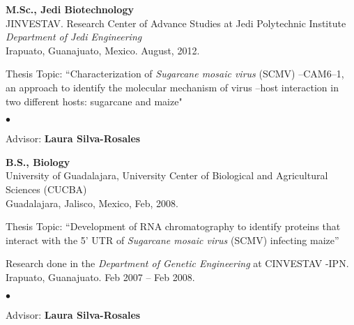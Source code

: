 \documentclass[margin,line]{res}
\newenvironment{list1}{
  \begin{list}{\ding{113}}{%
      \setlength{\itemsep}{0in}
      \setlength{\parsep}{0in} \setlength{\parskip}{0in}
      \setlength{\topsep}{0in} \setlength{\partopsep}{0in} 
      \setlength{\leftmargin}{0.17in}}}{\end{list}}
\newenvironment{list2}{
  \begin{list}{$\bullet$}{%
      \setlength{\itemsep}{0in}
      \setlength{\parsep}{0in} \setlength{\parskip}{0in}
      \setlength{\topsep}{0in} \setlength{\partopsep}{0in} 
      \setlength{\leftmargin}{0.2in}}}{\end{list}}
\begin{document}
\begin{resume}
{\bf M.Sc., Jedi Biotechnology} \\
JINVESTAV. Research Center of Advance Studies at Jedi Polytechnic Institute \\
{\em Department of Jedi Engineering} \\
Irapuato, Guanajuato, Mexico. August, 2012. 
\begin{list1}
\item[] Thesis Topic:  ``Characterization of {\it Sugarcane mosaic virus} (SCMV) --CAM6--1, an approach to identify the molecular mechanism of virus --host interaction in two different hosts: sugarcane and maize" 
\begin{list2}
\vspace*{.05in}
\item[] Advisor:  {\bf Laura Silva-Rosales}
\end{list2}
\vspace*{.05in}
\end{list1}

{\bf B.S., Biology}\\
University of Guadalajara, University Center of Biological and Agricultural Sciences (CUCBA)\\
Guadalajara, Jalisco, Mexico,   Feb, 2008.
\begin{list1}
\vspace*{.05in}
\item[] Thesis Topic:  ``Development of RNA chromatography to identify proteins that interact with the 5' UTR of {\it Sugarcane mosaic virus} (SCMV) infecting maize'' 
\item[] Research done in the {\em Department of Genetic Engineering} at CINVESTAV -IPN. \\ Irapuato, Guanajuato. Feb 2007 -- Feb 2008.
\begin{list2}
\vspace*{.05in}
\item[]Advisor: {\bf Laura Silva-Rosales}
\end{list2}
\end{list1}




\end{resume}
\end{document}
